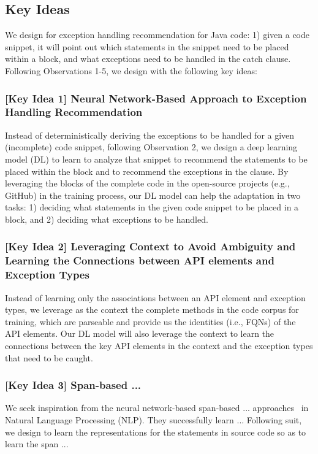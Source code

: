 \subsection{Key Ideas}
\label{key:sec}

\noindent We design {\tool} for exception handling recommendation for
Java code: 1) given a code snippet, it will point out which statements
in the snippet need to be placed within a  block, and
what exceptions need to be handled in the catch clause. Following
Observations 1-5, we design {\tool} with the following key ideas:

\subsubsection{{\bf [Key Idea 1] Neural Network-Based Approach to Exception Handling Recommendation}}
Instead of deterministically deriving the exceptions to be handled for
a given (incomplete) code snippet, following Observation 2, we design
a deep learning model (DL) to learn to analyze that snippet to
recommend the statements to be placed within the 
block and to recommend the exceptions in the  clause.  By
leveraging the  blocks of the complete code in the
open-source projects (e.g., GitHub) in the training process, our DL
model can help the adaptation in two tasks: 1) deciding what
statements in the given code snippet to be placed in a
 block, and 2) deciding what exceptions to be handled.

\vspace{2pt}
\subsubsection{{\bf [Key Idea 2] Leveraging Context to Avoid
Ambiguity and Learning the Connections between API elements and
Exception Types}} Instead of learning only the associations between an
API element and exception types, we leverage as the context the
complete methods in the code corpus for training, which are parseable
and provide us the identities (i.e., FQNs) of the API elements. Our DL
model will also leverage the context to learn the connections between
the key API elements in the context and the exception types that need
to be caught.

\subsubsection{{\bf [Key Idea 3] Span-based ...}}
We seek inspiration from the neural network-based span-based ...
approaches~\cite{?} in Natural Language Processing (NLP). They
successfully learn ... Following suit, we design \tool to learn the
representations for the statements in source code so as to learn the
span ...


